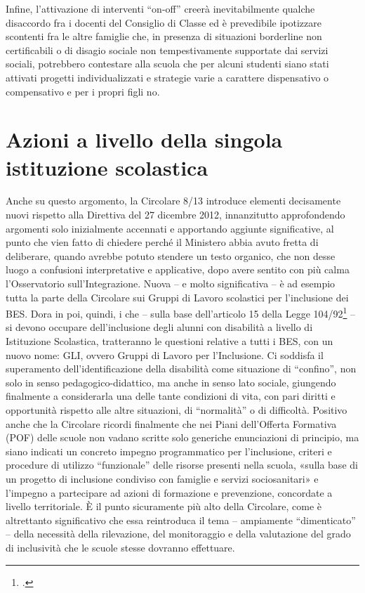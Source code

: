 Infine, l'attivazione di interventi “on-off” creerà inevitabilmente qualche disaccordo fra i docenti del Consiglio di Classe ed è prevedibile ipotizzare scontenti fra le altre famiglie che, in presenza di situazioni borderline non certificabili o di disagio sociale non tempestivamente supportate dai servizi sociali, potrebbero contestare alla scuola che per alcuni studenti siano stati attivati progetti individualizzati e strategie varie a carattere dispensativo o compensativo e per i propri figli no.
\section*{Azioni a livello della singola istituzione scolastica}
Anche su questo argomento, la Circolare 8/13 introduce elementi decisamente nuovi rispetto alla Direttiva del 27 dicembre 2012, innanzitutto approfondendo argomenti solo inizialmente accennati e apportando aggiunte significative, al punto che vien fatto di chiedere perché il Ministero abbia avuto fretta di deliberare, quando avrebbe potuto stendere un testo organico, che non desse luogo a confusioni interpretative e applicative, dopo avere sentito con più calma l'Osservatorio sull'Integrazione.
Nuova – e molto significativa – è ad esempio tutta la parte della Circolare sui Gruppi di Lavoro scolastici per l'inclusione dei BES. Dora in poi, quindi, i  che – sulla base dell'articolo 15 della Legge 104/92\footcite{Legge_104_92} – si devono occupare dell'inclusione degli alunni con disabilità a livello di Istituzione Scolastica, tratteranno le questioni relative a tutti i BES, con un nuovo nome: GLI, ovvero Gruppi di Lavoro per l'Inclusione.
Ci soddisfa il superamento dell'identificazione della disabilità come situazione di “confino”, non solo in senso pedagogico-didattico, ma anche in senso lato sociale, giungendo finalmente a considerarla una delle tante condizioni di vita, con pari diritti e opportunità rispetto alle altre situazioni, di “normalità” o di difficoltà.
Positivo anche che la Circolare ricordi finalmente che nei Piani dell'Offerta Formativa (POF) delle scuole non vadano scritte solo generiche enunciazioni di principio, ma siano indicati un concreto impegno programmatico per l'inclusione, criteri e procedure di utilizzo “funzionale” delle risorse presenti nella scuola, «sulla base di un progetto di inclusione condiviso con famiglie e servizi sociosanitari» e l'impegno a partecipare ad azioni di formazione e prevenzione, concordate a livello territoriale.
È il punto sicuramente più alto della Circolare, come è altrettanto significativo che essa reintroduca il tema – ampiamente “dimenticato” – della necessità della rilevazione, del monitoraggio e della valutazione del grado di inclusività che le scuole stesse dovranno effettuare.
